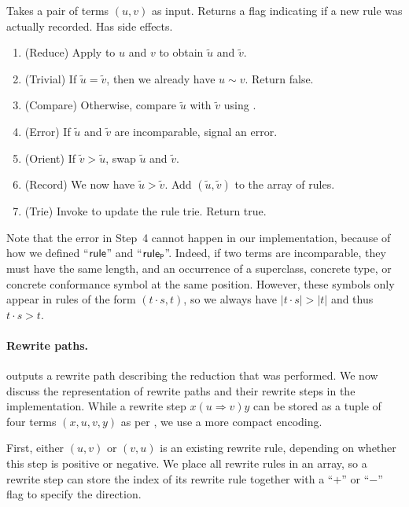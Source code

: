 \documentclass[../generics]{subfiles}
\begin{document}
\begin{algorithm}\label{add rewrite rule}
Takes a pair of terms $(u,v)$ as input. Returns a flag indicating if a new rule was actually recorded. Has side effects.
\begin{enumerate}
\item (Reduce) Apply  to $u$ and $v$ to obtain $\tilde{u}$ and $\tilde{v}$.
\item (Trivial) If $\tilde{u}=\tilde{v}$, then we already have $u\sim v$. Return false.
\item (Compare) Otherwise, compare $\tilde{u}$ with $\tilde{v}$ using .
\item (Error) If $\tilde{u}$ and $\tilde{v}$ are incomparable, signal an error.
\item (Orient) If $\tilde{v}>\tilde{u}$, swap $\tilde{u}$ and $\tilde{v}$.
\item (Record) We now have $\tilde{u}>\tilde{v}$. Add $(\tilde{u},\tilde{v})$ to the array of rules.
\item (Trie) Invoke  to update the rule trie. Return true.
\end{enumerate}
\end{algorithm}
Note that the error in Step~4 cannot happen in our implementation, because of how we defined ``$\mathsf{rule}$'' and ``$\mathsf{rule}_{\texttt{P}}$''. Indeed, if two terms are incomparable, they must have the same length, and an occurrence of a superclass, concrete type, or concrete conformance symbol at the same position. However, these symbols only appear in rules of the form $(t\cdot s,t)$, so we always have $|t\cdot s|>|t|$ and thus $t\cdot s>t$.

\paragraph{Rewrite paths.}
 outputs a rewrite path describing the reduction that was performed. We now discuss the representation of rewrite paths and their rewrite steps in the implementation. While a rewrite step $x(u\Rightarrow v)y$ can be stored as a tuple of four terms $(x,u,v,y)$ as per , we use a more compact encoding.

First, either $(u,v)$ or $(v,u)$ is an existing rewrite rule, depending on whether this step is positive or negative. We place all rewrite rules in an array, so a rewrite step can store the index of its rewrite rule together with a ``$+$'' or ``$-$'' flag to specify the direction.
\end{document}
